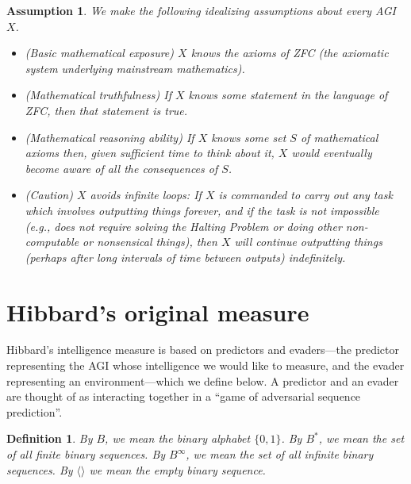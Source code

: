\documentclass{article}
\newtheorem{definition}[theorem]{Definition}
\newtheorem{assumption}[theorem]{Assumption}
\begin{document}
\begin{assumption}
\label{idealizingassumption}
    We make the following idealizing assumptions about every AGI $X$.
    \begin{itemize}
        \item
        (Basic mathematical exposure) $X$ knows the axioms of ZFC (the axiomatic
        system underlying mainstream mathematics).
        \item
        (Mathematical truthfulness) If $X$ knows some statement in the language
        of ZFC, then that statement is true.
        \item
        (Mathematical reasoning ability) If $X$ knows some set $S$ of mathematical
        axioms then, given sufficient time to think about it, $X$ would eventually
        become aware of all the consequences of $S$.
        \item
        (Caution) $X$ avoids infinite loops: If $X$ is commanded to carry out any
        task which involves outputting things
        forever, and if the task is not impossible
        (e.g., does not require solving the Halting Problem or doing other
        non-computable or nonsensical things),
        then $X$ will continue outputting things (perhaps
        after long intervals of time between outputs) indefinitely.
    \end{itemize}
\end{assumption}

\section{Hibbard's original measure}
\label{originalmeasuresection}

Hibbard's intelligence measure is based on predictors and evaders---the predictor
representing the AGI whose intelligence we would like to measure, and the evader
representing an environment---which we define below. A predictor and an evader
are thought of as interacting together in a ``game of adversarial sequence prediction''.

\begin{definition}
By $B$, we mean the binary alphabet $\{0,1\}$. By $B^*$, we mean the set of all
finite binary sequences. By $B^\infty$, we mean the set of all infinite binary
sequences. By $\langle\rangle$ we mean the empty binary sequence.
\end{definition}
\end{document}
